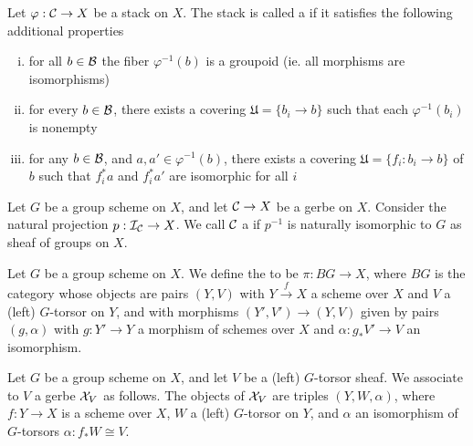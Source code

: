 \begin{defn}
Let $\varphi: \mathcal{C}\rightarrow X$ be a stack on $X$.  The stack is called a  if it satisfies the following additional properties
\begin{enumerate}[(i)]
\item  for all $b\in\mathcal{B}$ the fiber $\varphi^{-1}(b)$ is a groupoid (ie. all morphisms are isomorphisms)
\item  for every $b\in \mathcal{B}$, there exists a covering $\mathfrak U = \{b_i\rightarrow b\}$ such that each $\varphi^{-1}(b_i)$ is nonempty
\item  for any $b\in\mathcal{B}$, and $a,a'\in \varphi^{-1}(b)$, there exists a covering $\mathfrak U=\{f_i: b_i\rightarrow b\}$ of $b$ such that $f_i^*a$ and $f_i^*a'$ are isomorphic for all $i$
\end{enumerate}
\end{defn}

\begin{defn}
Let $G$ be a group scheme on $X$, and let $\mathcal{C}\rightarrow X$ be a gerbe on $X$.  Consider the natural projection $p: \mathcal{I}_{\mathcal{C}}\rightarrow X$.  We call $\mathcal{C}$ a  if $p^{-1}$ is naturally isomorphic to $G$ as sheaf of groups on $X$.
\end{defn}

\begin{ex}
Let $G$ be a group scheme on $X$.  We define the  to be $\pi: BG\rightarrow X$, where $BG$ is the category whose objects are pairs $(Y,V)$ with $Y\xrightarrow{f}X$ a scheme over $X$ and $V$ a (left) $G$-torsor on $Y$, and with morphisms $(Y',V')\rightarrow (Y,V)$ given by pairs $(g,\alpha)$ with $g: Y'\rightarrow Y$ a morphism of schemes over $X$ and $\alpha: g_*V'\rightarrow V$ an isomorphism.
\end{ex}

\begin{ex}
Let $G$ be a group scheme on $X$, and let $V$ be a (left) $G$-torsor sheaf.  We associate to $V$ a gerbe $\mathcal{X}_V$ as follows.  The objects of $\mathcal{X}_V$ are triples $(Y,W,\alpha)$, where $f:Y\rightarrow X$ is a scheme over $X$, $W$ a (left) $G$-torsor on $Y$, and $\alpha$ an isomorphism of $G$-torsors $\alpha: f_*W\cong V$.
\end{ex}

